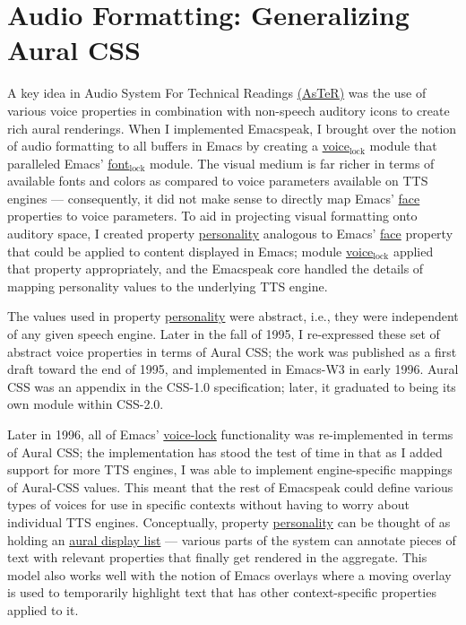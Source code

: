 \documentclass[11pt]{article}
\begin{document}
\section{Audio Formatting: Generalizing Aural CSS}
\label{sec-8}


A key idea in Audio System For Technical Readings \href{http://www.cs.cornell.edu/home/raman/aster/aster-toplevel.html}{(AsTeR)} was the
use of various voice properties in combination with non-speech
auditory icons to create rich aural renderings. When I
implemented Emacspeak, I brought over the notion of audio
formatting to all buffers in Emacs by creating a \uline{voice$_{\text{lock}}$}
module that paralleled Emacs' \uline{font$_{\text{lock}}$} module. The visual
medium is far richer in terms of available fonts and colors as
compared to voice parameters available on TTS engines  — 
consequently, it did not make sense to directly map Emacs' \uline{face}
properties to voice parameters. To aid in projecting visual
formatting onto auditory space, I created property \uline{personality}
analogous to Emacs' \uline{face} property that could be applied to
content displayed in Emacs; module \uline{voice$_{\text{lock}}$} applied that
property appropriately, and the Emacspeak core handled the
details of mapping personality values to the underlying TTS
engine. 

The values used in property \uline{personality} were abstract, i.e.,
they were independent of any given speech engine. Later in the
fall of 1995, I re-expressed these set of abstract voice
properties in terms of Aural CSS; the work was published as a
first draft toward the end of 1995, and implemented in Emacs-W3
in early 1996. Aural CSS was an appendix in the CSS-1.0
specification; later, it graduated to being its own module within
CSS-2.0.

Later in 1996, all of Emacs' \uline{voice-lock} functionality was
re-implemented in terms of Aural CSS; the implementation has
stood the test of time in that as I added support for more TTS
engines, I was  able to implement engine-specific mappings of
Aural-CSS values. This meant that the rest of Emacspeak could
define various types of voices for use in specific contexts
without having to worry about individual TTS engines.
Conceptually, property \uline{personality} can be thought of as holding
an \uline{aural display list}  —   various parts of the system can
annotate pieces of text with relevant properties that finally get
rendered in the aggregate. 
This model also works well with the notion of Emacs overlays
where a moving overlay is used to temporarily highlight text that
has other context-specific properties applied to it.
\end{document}
